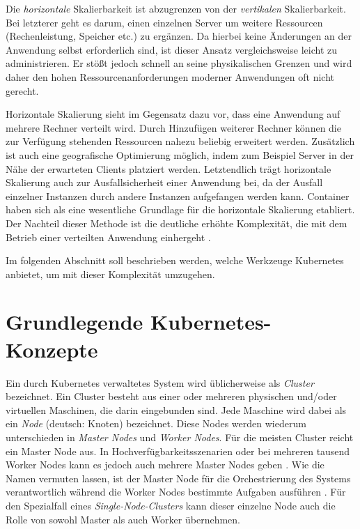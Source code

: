 \documentclass[11pt,a4paper]{article}
\begin{document}
Die \emph{horizontale} Skalierbarkeit ist abzugrenzen von der \emph{vertikalen} Skalierbarkeit.
Bei letzterer geht es darum, einen einzelnen Server um weitere Ressourcen (Rechenleistung, Speicher etc.) zu ergänzen.
Da hierbei keine Änderungen an der Anwendung selbst erforderlich sind, ist dieser Ansatz vergleichsweise leicht
zu administrieren. Er stößt jedoch schnell an seine physikalischen Grenzen und wird daher den hohen
Ressourcenanforderungen moderner Anwendungen oft nicht gerecht.

Horizontale Skalierung sieht im Gegensatz dazu vor, dass eine Anwendung
auf mehrere Rechner verteilt wird. Durch Hinzufügen weiterer Rechner können die zur Verfügung stehenden Ressourcen nahezu beliebig erweitert werden.
Zusätzlich ist auch eine geografische Optimierung möglich, indem zum Beispiel Server in der Nähe der erwarteten Clients platziert werden.
Letztendlich trägt horizontale Skalierung auch zur Ausfallsicherheit einer Anwendung bei, da der Ausfall einzelner Instanzen durch andere Instanzen
aufgefangen werden kann.
Container haben sich als eine wesentliche Grundlage für die horizontale Skalierung etabliert.
Der Nachteil dieser Methode ist die deutliche erhöhte Komplexität,
die mit dem Betrieb einer verteilten Anwendung einhergeht \cite{Schmeling_Dargatz_2022}.

Im folgenden Abschnitt soll beschrieben werden, welche Werkzeuge Kubernetes anbietet, um mit dieser Komplexität umzugehen.

\section{Grundlegende Kubernetes-Konzepte}
\label{sec:Grundlegende_Kubernetes-Konzepte}
Ein durch Kubernetes verwaltetes System wird üblicherweise als \emph{Cluster} bezeichnet.
Ein Cluster besteht aus einer oder mehreren physischen und/oder virtuellen Maschinen, die darin eingebunden sind.
Jede Maschine wird dabei als ein \emph{Node} (deutsch: Knoten) bezeichnet. Diese Nodes werden wiederum unterschieden in
\emph{Master Nodes} und \emph{Worker Nodes}.
Für die meisten Cluster reicht ein Master Node aus. In Hochverfügbarkeitsszenarien oder bei mehreren
tausend Worker Nodes kann es jedoch auch mehrere Master Nodes geben \cite{Schmeling_Dargatz_2022}.
Wie die Namen vermuten lassen, ist der Master Node für die Orchestrierung
des Systems verantwortlich während die Worker Nodes bestimmte Aufgaben ausführen \cite{Bentaleb_Belloum_Sebaa_El-Maouhab_2021}.
Für den Spezialfall eines \emph{Single-Node-Clusters} kann dieser einzelne Node auch die Rolle von sowohl
Master als auch Worker übernehmen.
\end{document}
